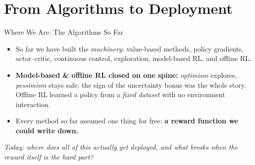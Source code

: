 \section{From Algorithms to Deployment}


\newcommand{\srcnote}[1]{%
  \begingroup
  \renewcommand{\thefootnote}{}%
  \footnote{#1}%
  \addtocounter{footnote}{-1}%
  \endgroup}

\begin{frame}{Where We Are: The Algorithms So Far}
\begin{itemize}\itemsep0.5em
    \item So far we have built the \emph{machinery}: value-based methods, policy
          gradients, actor--critic, continuous control, exploration, model-based
          RL, and offline RL.
    \item \textbf{Model-based \& offline RL closed on one spine:} \emph{optimism} explores,
          \emph{pessimism} stays safe; the sign of the uncertainty bonus was
          the whole story. Offline RL learned a policy from a \emph{fixed dataset}
          with no environment interaction.
    \item Every method so far assumed one thing for free: \textbf{a reward
          function we could write down.}
\end{itemize}
\vfill
\begin{center}
\itshape Today: where does all of this actually get deployed, and what breaks
when the reward itself is the hard part?
\end{center}
\end{frame}

